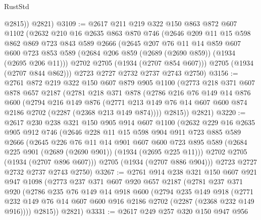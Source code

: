 \begin{lexlean}{RustStd}
\begin{coremodule}
          @2815))
      @2821)
@3109 := @2617
    @211
    @219
    @322
    @150
    @863
    @872
    @607
    @1102
    (@2632
      @210
      @16
      @2635
      @863
      @870
      @746
      (@2646
        @209
        @11
        @15
        @598
        @862
        @869
        @723
        @843
        @589
        @2666
        (@2645
          @207
          @76
          @11
          @14
          @859
          @607
          @600
          @723
          @853
          @589
          (@2684 @206 @859 (@2689 (@2690 @859)) (@1934 (@2695 @206 @11)))
          @2702
          @2705
          (@1934 (@2707 @854 @607)))
        @2705
        (@1934 (@2707 @844 @862)))
      @2723
      @2727
      @2732
      @2737
      @2743
      @2750)
@3156 := @2761
    @872
    @219
    @322
    @150
    @607
    @879
    @905
    @1100
    (@2773
      @218
      @371
      @607
      @878
      @657
      @2187
      (@2781
        @218
        @371
        @878
        (@2786
          @216
          @76
          @149
          @14
          @876
          @600
          (@2794
            @216
            @149
            @876
            (@2771 @213 @149 @76 @14 @607 @600 @874 @2186 @2702 (@2287 (@2368 @213 @149 @874))))
          @2815))
      @2821)
@3220 := @2617
    @230
    @238
    @321
    @150
    @905
    @914
    @607
    @1100
    (@2632
      @229
      @16
      @2635
      @905
      @912
      @746
      (@2646
        @228
        @11
        @15
        @598
        @904
        @911
        @723
        @885
        @589
        @2666
        (@2645
          @226
          @76
          @11
          @14
          @901
          @607
          @600
          @723
          @895
          @589
          (@2684 @225 @901 (@2689 (@2690 @901)) (@1934 (@2695 @225 @11)))
          @2702
          @2705
          (@1934 (@2707 @896 @607)))
        @2705
        (@1934 (@2707 @886 @904)))
      @2723
      @2727
      @2732
      @2737
      @2743
      @2750)
@3267 := @2761
    @914
    @238
    @321
    @150
    @607
    @921
    @947
    @1098
    (@2773
      @237
      @371
      @607
      @920
      @657
      @2187
      (@2781
        @237
        @371
        @920
        (@2786
          @235
          @76
          @149
          @14
          @918
          @600
          (@2794
            @235
            @149
            @918
            (@2771 @232 @149 @76 @14 @607 @600 @916 @2186 @2702 (@2287 (@2368 @232 @149 @916))))
          @2815))
      @2821)
@3331 := @2617
    @249
    @257
    @320
    @150
    @947
    @956

\end{coremodule}
\end{lexlean}
